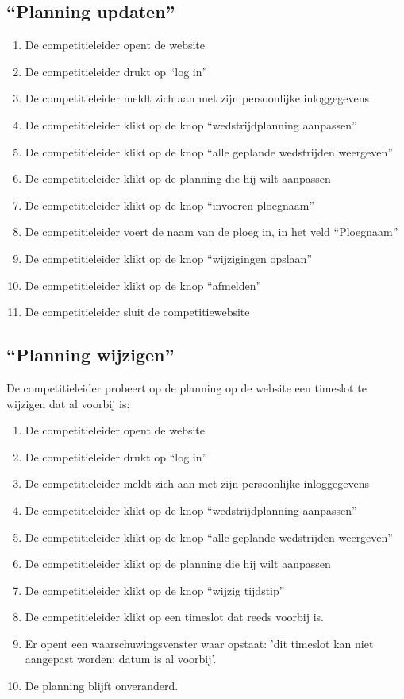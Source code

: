\documentclass[12pt,a4paper]{article}
\begin{document}
			\subsection{``Planning updaten''}
			\begin{enumerate}
				\item De competitieleider opent de website
				\item De competitieleider drukt op ``log in''
				\item De competitieleider meldt zich aan met zijn persoonlijke inloggegevens
				\item De competitieleider klikt op de knop ``wedstrijdplanning aanpassen''
				\item De competitieleider klikt op de knop ``alle geplande wedstrijden weergeven''
				\item De competitieleider klikt op de planning die hij wilt aanpassen
				\item De competitieleider klikt op de knop ``invoeren ploegnaam''
				\item De competitieleider voert de naam van de ploeg in, in het veld ``Ploegnaam''
				\item De competitieleider klikt op de knop ``wijzigingen opslaan''
				\item De competitieleider klikt op de knop ``afmelden''
				\item De competitieleider sluit de competitiewebsite
			\end{enumerate}
			\subsection{``Planning wijzigen''}
			De competitieleider probeert op de planning op de website een timeslot te wijzigen dat al voorbij is:
			\begin{enumerate}
				\item De competitieleider opent de website
				\item De competitieleider drukt op “log in” 
				\item De competitieleider meldt zich aan met zijn persoonlijke inloggegevens
				\item De competitieleider klikt op de knop ``wedstrijdplanning aanpassen'' 
				\item De competitieleider klikt op de knop ``alle geplande wedstrijden weergeven''
				\item De competitieleider klikt op de planning die hij wilt aanpassen
				\item De competitieleider klikt op de knop ``wijzig tijdstip''
				\item De competitieleider klikt op een timeslot dat reeds voorbij is.
				\item Er opent een waarschuwingsvenster waar opstaat: 'dit timeslot kan niet aangepast worden: datum is al voorbij'.
				\item De planning blijft onveranderd.
			\end{enumerate}
\end{document}
